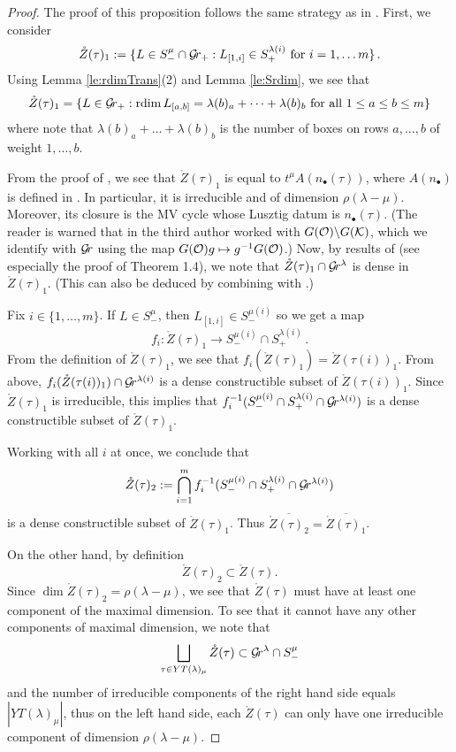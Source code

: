 \documentclass{article}
\begin{document}
\begin{proof}
The proof of this proposition follows the same strategy as in \cite{dthesis}.
First, we consider 
\begin{equation*}
    \mathring Z(\tau)_1 := \{ L \in S^\mu_- \cap \mathcal{G}\!r_+ : L_{[1,i]} \in S_+^{\lambda(i)} \text{ for } i = 1, \dots m\} \,. 
\end{equation*}
% 
Using Lemma \ref{le:rdimTrans}(2) and Lemma \ref{le:Srdim}, we see that
$$
    \mathring Z(\tau)_1 = \{ L \in \mathcal{G}\!r_+ : \operatorname{rdim} L_{[a,b]} = \lambda(b)_a + \dots + \lambda(b)_b \text{ for all $ 1 \le a \le b \le m $} \}
$$
where note that $ \lambda(b)_a + \dots + \lambda(b)_b$ is the number of boxes on rows $ a, \dots, b$ of weight $ 1, \dots, b $.

From  the proof of \cite[Proposition 9.6]{kamnitzer2010mirkovic}, we see that $ \mathring Z(\tau)_1$ is equal to $ t^\mu A(n_\bullet(\tau))$, where $ A(n_\bullet)$ is defined in  \cite[Sect.\ 4.3]{kamnitzer2010mirkovic}. In particular, it is irreducible and of dimension $ \rho(\lambda- \mu)$. Moreover, its closure is the MV cycle whose Lusztig datum is $ n_\bullet(\tau) $. (The reader is warned that in \cite{kamnitzer2010mirkovic} the third author worked with $  G(\mathcal O) \backslash G(\mathcal K)$, which we identify with $ \mathcal{G}\!r $ using the map $ G(\mathcal O) g \mapsto g^{-1} G(\mathcal O)$.) 
% 
Now, by results of \cite{kamnitzer2008hives} (see especially the proof of Theorem 1.4), we note that $\mathring Z(\tau)_1\cap \mathcal{G}\!r^\lambda$ is dense in $ \mathring Z(\tau)_1$.  (This can also be deduced by combining  with \cite[Proposition 6]{anderson2003polytope}.)

Fix $ i \in \{1, \dots, m\}$. If $ L \in S^\mu_-$, then $ L_{[1,i]} \in S^{\mu(i)}_-$ so we get a map 
$$ 
    f_i : \mathring Z(\tau)_1 \rightarrow S^{\mu(i)}_- \cap S_+^{\lambda(i)} \,. 
$$
From the definition of $ \mathring Z(\tau)_1 $, we see that $ f_i(\mathring Z(\tau)_1 )= \mathring Z(\tau(i))_1$.  
From above, $  f_i(\mathring Z(\tau(i))_1) \cap \mathcal{G}\!r^{\lambda(i)}$ is a dense constructible subset of $\mathring Z(\tau(i))_1$.  
Since $ \mathring Z(\tau)_1$ is irreducible, this implies that $ f_i^{-1}(S^{\mu(i)}_- \cap S_+^{\lambda(i)} \cap \mathcal{G}\!r^{\lambda(i)}) $ is a dense constructible subset of $ \mathring Z(\tau)_1 $.  

Working with all $ i $ at once, we conclude that
$$ 
    \mathring Z(\tau)_2 := \bigcap_{i=1}^m f_i^{-1}(S^{\mu(i)}_- \cap S_+^{\lambda(i)} \cap \mathcal{G}\!r^{\lambda(i)}) 
$$
is a dense constructible subset of $\mathring Z(\tau)_1$. Thus $\overline{\mathring Z(\tau)_2} = \overline{\mathring Z(\tau)_1}$.

On the other hand, by definition 
$$
    \mathring Z(\tau)_2 \subset \mathring Z(\tau).
$$
Since $ \dim \mathring Z(\tau)_2 = \rho(\lambda - \mu)$, we see that $ \mathring Z(\tau) $ must have at least one component of the maximal dimension.  To see that it cannot have any other components of maximal dimension, we note that
$$ \bigsqcup_{\tau \in YT(\lambda)_\mu} \mathring Z(\tau) \subset \mathcal{G}\!r^\lambda \cap S_-^\mu$$
and the number of irreducible components of the right hand side equals $|YT(\lambda)_\mu|$, thus on the left hand side, each $ \mathring Z(\tau)$ can only have one irreducible component of dimension $ \rho(\lambda - \mu)$.
\end{proof}
\end{document}
